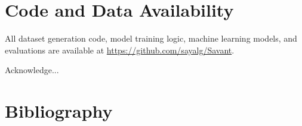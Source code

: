 \documentclass[times, twoside]{zHenriquesLab-StyleBioRxiv}
\begin{document}
\section*{Code and Data Availability}

All dataset generation code, model training logic, machine learning models, and evaluations are available at \href{https://github.com/sayalg/Savant}{https://github.com/sayalg/Savant}.

\begin{acknowledgements}
Acknowledge...
\end{acknowledgements}

\section*{Bibliography}

\end{document}
